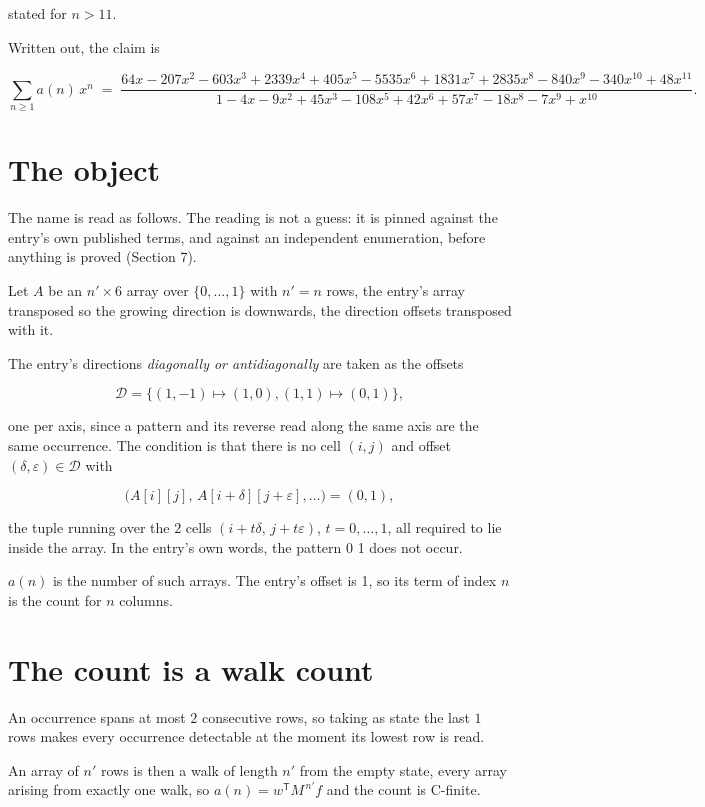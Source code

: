 \documentclass[11pt]{article}
\theoremstyle{definition}
\begin{document}
stated for $n > 11$.

Written out, the claim is

\[\sum_{n \ge 1} a(n)\,x^n \;=\; \frac{64x - 207x^{2} - 603x^{3} + 2339x^{4} + 405x^{5} - 5535x^{6} + 1831x^{7} + 2835x^{8} - 840x^{9} - 340x^{10} + 48x^{11}}{1 - 4x - 9x^{2} + 45x^{3} - 108x^{5} + 42x^{6} + 57x^{7} - 18x^{8} - 7x^{9} + x^{10}}.\]

\section{The object}

The name is read as follows. The reading is not a guess: it is pinned against the entry's own published terms, and against an independent enumeration, before anything is proved (Section 7).

Let $A$ be an $n' \times 6$ array over $\{0,\dots,1\}$ with $n' = n$ rows, the entry's array transposed so the growing direction is downwards, the direction offsets transposed with it.

The entry's directions {\itshape diagonally or antidiagonally} are taken as the offsets

\[\mathcal{D} = \{(1,-1)\mapsto(1,0), (1,1)\mapsto(0,1)\},\]

one per axis, since a pattern and its reverse read along the same axis are the same occurrence. The condition is that there is no cell $(i,j)$ and offset $(\delta,\varepsilon)\in\mathcal{D}$ with

\[\bigl(A[i][j],\,A[i{+}\delta][j{+}\varepsilon],\dots\bigr) = (0, 1),\]

the tuple running over the $2$ cells $(i+t\delta,\,j+t\varepsilon)$, $t = 0,\dots,1$, all required to lie inside the array. In the entry's own words, the pattern 0 1 does not occur.

$a(n)$ is the number of such arrays. The entry's offset is 1, so its term of index $n$ is the count for $n$ columns.

\section{The count is a walk count}

An occurrence spans at most $2$ consecutive rows, so taking as state the last $1$ rows makes every occurrence detectable at the moment its lowest row is read.

An array of $n'$ rows is then a walk of length $n'$ from the empty state, every array arising from exactly one walk, so $a(n) = w^{\mathsf T}M^{\,n'}f$ and the count is C-finite.
\end{document}

